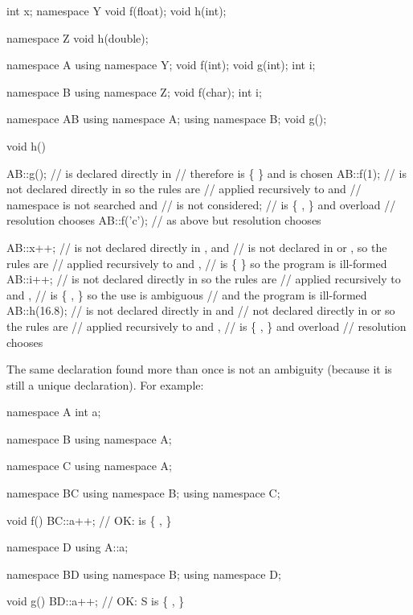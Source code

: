 \begin{codeblock}
int x;
namespace Y {
	void f(float);
	void h(int);
}

namespace Z {
	void h(double);
}

namespace A {
	using namespace Y;
	void f(int);
	void g(int);
	int i;
}

namespace B {
	using namespace Z;
	void f(char);
	int i;
}

namespace AB {
	using namespace A;
	using namespace B;
	void g();
}

void h()
{
	AB::g();		//  is declared directly in 
				// therefore  is \{ \tcode{AB::g()} \} and  is chosen
	AB::f(1);		//  is not declared directly in  so the rules are
				// applied recursively to  and 
				// namespace  is not searched and 
				// is not considered;
				//  is \{ ,  \} and overload
				// resolution chooses 
	AB::f('c');		// as above but resolution chooses 

	AB::x++;		//  is not declared directly in , and
				// is not declared in  or  , so the rules are
				// applied recursively to  and ,
				//  is \{ \} so the program is ill-formed
	AB::i++;		//  is not declared directly in  so the rules are
				// applied recursively to  and ,
				//  is \{  ,  \} so the use is ambiguous
				// and the program is ill-formed
	AB::h(16.8);		//  is not declared directly in  and
				// not declared directly in  or  so the rules are
				// applied recursively to  and ,
				//  is \{ ,  \} and overload
				// resolution chooses 
}
\end{codeblock}

\pnum
The same declaration found more than once is not an ambiguity (because
it is still a unique declaration). For example:

\begin{codeblock}
namespace A {
	int a;
}

namespace B {
	using namespace A;
}

namespace C {
	using namespace A;
}

namespace BC {
	using namespace B;
	using namespace C;
}

void f()
{
	BC::a++;		// OK:  is \{ \tcode{A::a},  \}
}

namespace D {
	using A::a;
}

namespace BD {
	using namespace B;
	using namespace D;
}

void g()
{
	BD::a++;		// OK: S is \{ ,  \}
}
\end{codeblock}

